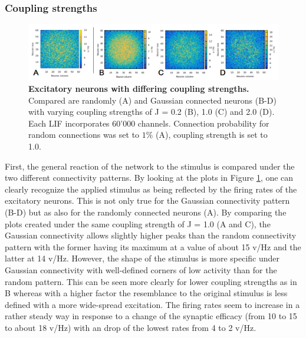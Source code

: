 \documentclass[14pt]{SelfArx} %
\numberwithin{equation}{section}
\begin{document}
\subsubsection{Coupling strengths}
\begin{figure} [htp]
\centering
\includegraphics[width = 1.0\textwidth]{ex60_J.png}
\caption{\textbf{Excitatory neurons with differing coupling strengths.} Compared are randomly (A) and Gaussian connected neurons (B-D) with varying coupling strengths of J = 0.2 (B), 1.0 (C) and 2.0 (D). Each LIF incorporates 60'000 channels. Connection probability for random connections was set to $1 \%$ (A), coupling strength is set to 1.0.}
\label{fig:ex60j}
\end{figure}
First, the general reaction of the network to the stimulus is compared under the two different connectivity patterns. \newline 
By looking at the plots in Figure \ref{fig:ex60j}, one can clearly recognize the applied stimulus as being reflected by the firing rates of the excitatory neurons. This is not only true for the Gaussian connectivity pattern (B-D) but as also for the randomly connected neurons (A). By comparing the plots created under the same coupling strength of J = 1.0 (A and C), the Gaussian connectivity allows slightly higher peaks than the random connectivity pattern with the former having its maximum at a value of about 15 v/Hz and the latter at 14 v/Hz. However, the shape of the stimulus is more specific under Gaussian connectivity with well-defined corners of low activity than for the random pattern.\newline
This can be seen more clearly for lower coupling strengths as in B whereas with a higher factor the resemblance to the original stimulus is less defined with a more wide-spread excitation. The firing rates seem to increase in a rather steady way in response to a change of the synaptic efficacy (from 10 to 15 to about 18 v/Hz) with an drop of the lowest rates from 4 to 2 v/Hz.
\end{document}
